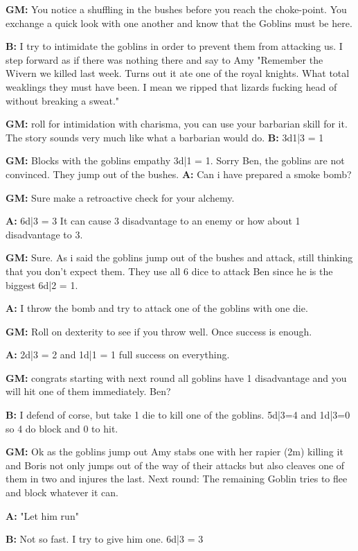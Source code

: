 \documentclass[11pt]{article}
\begin{document}
{\begin{multicols}{2}[]
\textbf{GM:} You notice a shuffling in the bushes before you reach the choke-point. You exchange a quick look with one another and know that the Goblins must be here. 

\textbf{B:} I try to intimidate the goblins in order to prevent them from attacking us. I step forward as if there was nothing there and say to Amy "Remember the Wivern we killed last week. Turns out it ate one of the royal knights. What total weaklings they must have been. I mean we ripped that lizards fucking head of without breaking a sweat."

\textbf{GM:} roll for intimidation with charisma, you can use your barbarian skill for it. The story sounds very much like what a barbarian would do.
\textbf{B:} 3d1|3 = 1

\textbf{GM:} Blocks with the goblins empathy 3d|1 = 1. Sorry Ben, the goblins are not convinced. They jump out of the bushes.
\textbf{A:} Can i have prepared a smoke bomb?

\textbf{GM:} Sure make a retroactive check for your alchemy.

\textbf{A:} 6d|3 = 3 It can cause 3 disadvantage to an enemy or how about 1 disadvantage to 3.

\textbf{GM:} Sure. As i said the goblins jump out of the bushes and attack, still thinking that you don't expect them. They use all 6 dice to attack Ben since he is the biggest 6d|2 = 1.

\textbf{A:} I throw the bomb and try to attack one of the goblins with one die.

\textbf{GM:} Roll on dexterity to see if you throw well. Once success is enough.

\textbf{A:} 2d|3 = 2 and 1d|1 = 1 full success on everything. 

\textbf{GM:} congrats starting with next round all goblins have 1 disadvantage and you will hit one of them immediately. Ben?

\textbf{B:} I defend of corse, but take 1 die to kill one of the goblins. 5d|3=4 and 1d|3=0 so 4 do block and 0 to hit.

\textbf{GM:} Ok as the goblins jump out Amy stabs one with her rapier (2m) killing it and Boris not only jumps out of the way of their attacks but also cleaves one of them in two and injures the last. Next round: The remaining Goblin tries to flee and block whatever it can.

\textbf{A:} "Let him run"

\textbf{B:} Not so fast. I try to give him one. 6d|3 = 3


\end{multicols}}
\end{document}
